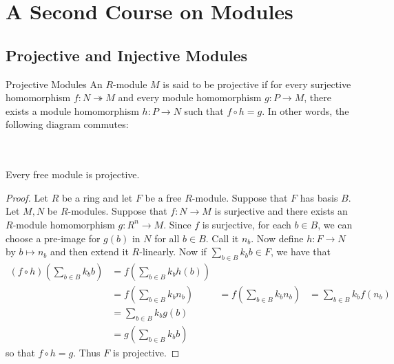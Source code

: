 \documentclass[a4paper]{article}
\begin{document}
\pagebreak
\section{A Second Course on Modules}
\subsection{Projective and Injective Modules}
\begin{defn}{Projective Modules}{} An $R$-module $M$ is said to be projective if for every surjective homomorphism $f:N\twoheadrightarrow M$ and every module homomorphism $g:P\to M$, there exists a module homomorphism $h:P\to N$ such that $f\circ h=g$. In other words, the following diagram commutes: \\~\\
 \\
\end{defn}

\begin{lmm}{}{} Every free module is projective. \tcbline
\begin{proof}
Let $R$ be a ring and let $F$ be a free $R$-module. Suppose that $F$ has basis $B$. Let $M,N$ be $R$-modules. Suppose that $f:N\to M$ is surjective and there exists an $R$-module homomorphism $g:R^n\to M$. Since $f$ is surjective, for each $b\in B$, we can choose a pre-image for $g(b)$ in $N$ for all $b\in B$. Call it $n_b$. Now define $h:F\to N$ by $b\mapsto n_b$ and then extend it $R$-linearly. Now if $\sum_{b\in B}k_bb\in F$, we have that 
\begin{align*}
(f\circ h)\left(\sum_{b\in B}k_bb\right)&=f\left(\sum_{b\in B}k_bh(b)\right)\\
&=f\left(\sum_{b\in B}k_bn_b\right)
&=f\left(\sum_{b\in B}k_bn_b\right)
&=\sum_{b\in B}k_bf(n_b)\\
&=\sum_{b\in B}k_bg(b)\\
&=g\left(\sum_{b\in B}k_bb\right)
\end{align*}
so that $f\circ h=g$. Thus $F$ is projective. 
\end{proof}
\end{lmm}
\end{document}
